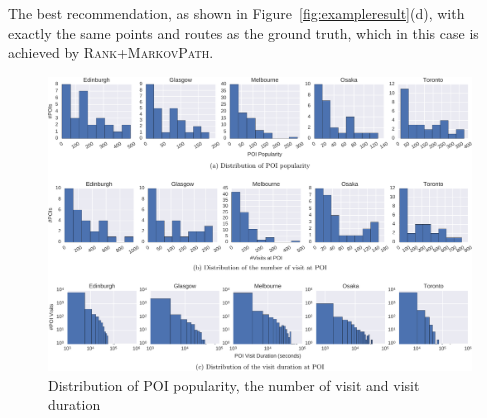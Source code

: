 The best recommendation, as shown in Figure~\ref{fig:exampleresult}(d), with exactly the same points and routes as the ground truth,
which in this case is achieved by \textsc{Rank+MarkovPath}.



\begin{figure}[t]
\includegraphics[width=\textwidth]{fig/feature_distro.pdf}
\caption{Distribution of POI popularity, the number of visit and visit duration}
\label{fig:distro}
\end{figure}
